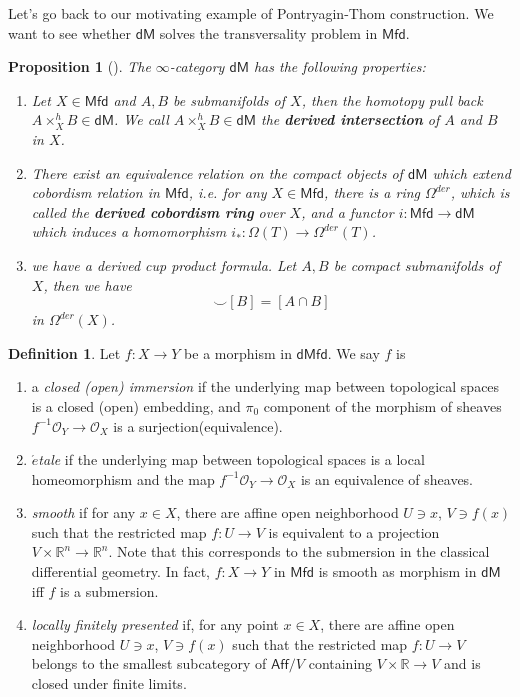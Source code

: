 \documentclass[12pt]{amsart}
\newtheorem{prop}[thm]{Proposition}
\theoremstyle{definition}
\newtheorem{defn}[thm]{Definition}
\theoremstyle{remark}
\numberwithin{equation}{section}
\newcommand{\CO}{{\mathcal O}}
\newcommand{\R}{{\mathbb{R}}}
\newcommand{\1}{{\mathbb{1}}}
\newcommand{\dm}{\mathsf{dM}}
\newcommand{\dmfd}{\mathsf{dMfd}}
\newcommand{\mfd}{\mathsf{Mfd}}
\newcommand{\aff}{\mathsf{Aff}}\newcommand{\alg}{\mathsf{Alg}}
\begin{document}
Let's go back to our motivating example of Pontryagin-Thom construction. We want to see whether $\dm$ solves the transversality problem in $\mfd$. 
\begin{prop}[\cite{Spi08}]
	The $\infty$-category $\dm$ has the following properties:
	\begin{enumerate}
		\item Let $X\in \mfd$ and $A,B$ be submanifolds of $X$, then the homotopy pull back $A\times_X^h B\in \dm$. We call $A\times_X^h B\in \dm$ the {\bf derived intersection} of $A$ and $B$ in $X$.
		\item There exist an equivalence relation on the compact objects of $\dm$ which extend cobordism relation in $\mfd$, i.e. for any $X\in \mfd$, there is a ring $\Omega^{der}$, which is called the {\bf derived cobordism ring} over $X$, and a functor $i: \mfd \to \dm$ which induces a homomorphism $i_*: \Omega(T) \to \Omega^{der}(T)$.
		\item we have a derived cup product formula. Let $A,B$ be compact submanifolds of $X$, then we have
		\begin{equation*}
		[A]\smile[B] =[A\cap B]
		\end{equation*}
		in $\Omega^{der}(X)$.
	\end{enumerate}
\end{prop}


\begin{defn}
    Let $f:X\to Y$ be a morphism in $\dmfd$. We say $f$ is 
\begin{enumerate}
	\item a {\it closed (open) immersion} if the underlying map between topological spaces is a closed (open) embedding, 
	and $\pi_0$ component of the morphism of sheaves $f^{-1}\CO_Y\to \CO_X$ is a surjection(equivalence).
	
	\item {\it $\acute{e}$tale} if the underlying map between topological spaces is a local homeomorphism and the map $f^{-1}\CO_Y\to \CO_X$ is an equivalence of sheaves.
	
	\item {\it smooth} if for any $x\in X$, there are affine open neighborhood $U\ni x$, $V\ni f(x)$ such that the restricted map $f:U\to V$ is equivalent to a projection $V\times \R^n \to \R^n$. Note that this corresponds to the submersion in the classical differential geometry. In fact, $f:X\to Y$ in $\mfd$ is smooth as morphism in $\dm$ iff $f$ is a submersion.
	\item {\it locally finitely presented} if, for any point $x\in X$, there are affine open neighborhood $U\ni x$, $V\ni f(x)$ such that the restricted map $f:U\to V$ belongs to the smallest subcategory of $\aff/V$ containing $V\times \R \to V$ and is closed under finite limits.
\end{enumerate}
\end{defn}
\end{document}
